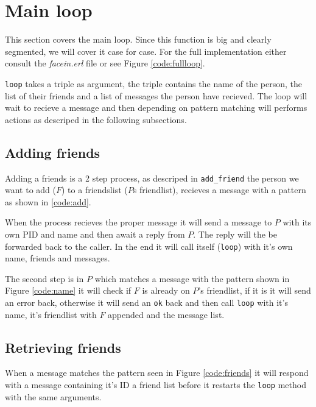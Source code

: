 \section{Main loop}
This section covers the main loop. Since this function is big and clearly
segmented, we will cover it case for case. For the full implementation either
consult the \textit{facein.erl} file or see Figure \ref{code:fullloop}.

\texttt{loop} takes a triple as argument, the triple contains the name of the
person, the list of their friends and a list of messages the person have
recieved. The loop will wait to recieve a message and then depending on
pattern matching will performs actions as descriped in the following
subsections.

\subsection{Adding friends}
Adding a friends is a 2 step process, as descriped in \texttt{add\_friend} the
person we want to add ($F$) to a friendslist ($P$s friendlist), recieves a
message with a pattern as shown in \ref{code:add}.


When the process recieves the proper message it will send a message to $P$
with its own PID and name and then await a reply from $P$. The reply will the
be forwarded back to the caller. In the end it will call itself
(\texttt{loop}) with it's own name, friends and messages.


The second step is in $P$ which matches a message with the pattern shown in
Figure \ref{code:name} it will check if $F$ is already on $P$'s friendlist, if
it is it will send an error back, otherwise it will send an \texttt{ok} back
and then call \texttt{loop} with it's name, it's friendlist with $F$ appended
and the message list.

\subsection{Retrieving friends}


When a message matches the pattern seen in Figure \ref{code:friends} it will
respond with a message containing it's ID a friend list before it restarts the
\texttt{loop} method with the same arguments.

